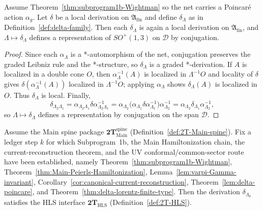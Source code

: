 \begin{lemma}
\label{lem:delta-lorentz-orbit}
Assume Theorem~\ref{thm:subprogram1b-Wightman} so the net carries a Poincar\'e
action $\alpha_g$. Let $\delta$ be a local derivation on $\mathfrak A_{\mathrm{fin}}$ and
define $\delta_\Lambda$ as in Definition~\ref{def:delta-family}. Then each
$\delta_\Lambda$ is again a local derivation on $\mathfrak A_{\mathrm{fin}}$, and
$\Lambda\mapsto\delta_\Lambda$ defines a representation of $SO^+(1,3)$ on $\mathscr D$
by conjugation.
\end{lemma}

\begin{proof}
Since each $\alpha_\Lambda$ is a *-automorphism of the net, conjugation preserves
the graded Leibniz rule and the *-structure, so $\delta_\Lambda$ is a graded *-derivation.
If $A$ is localized in a double cone $O$, then $\alpha_\Lambda^{-1}(A)$ is localized
in $\Lambda^{-1}O$ and locality of $\delta$ gives
$\delta(\alpha_\Lambda^{-1}(A))$ localized in $\Lambda^{-1}O$; applying $\alpha_\Lambda$
shows $\delta_\Lambda(A)$ is localized in $O$. Thus $\delta_\Lambda$ is local.
Finally,
\[
\delta_{\Lambda_2\Lambda_1}
=\alpha_{\Lambda_2\Lambda_1}\delta\alpha_{\Lambda_2\Lambda_1}^{-1}
=\alpha_{\Lambda_2}\big(\alpha_{\Lambda_1}\delta\alpha_{\Lambda_1}^{-1}\big)\alpha_{\Lambda_2}^{-1}
=\alpha_{\Lambda_2}\delta_{\Lambda_1}\alpha_{\Lambda_2}^{-1},
\]
so $\Lambda\mapsto\delta_\Lambda$ defines a representation by conjugation on the span
$\mathscr D$.
\end{proof}

\begin{theorem}
\label{thm:subprogram3b-HLS-hypotheses}
Assume the Main spine package \(\mathbf{2T}_{\mathrm{Main}}^{\mathrm{spine}}\)
\textnormal{(Definition~\ref{def:2T-Main-spine})}. Fix a ledger step \(k\) for which
Subprogram~1b, the Main Hamiltonization chain, the current-reconstruction theorem,
and the UV conformal/common-sector route have been established, namely
Theorem~\ref{thm:subprogram1b-Wightman},
Theorem~\ref{thm:Main-Peierls-Hamiltonization},
Lemma~\ref{lem:varpi-Gamma-invariant},
Corollary~\ref{cor:canonical-current-reconstruction},
Theorem~\ref{lem:delta-poincare},
and Theorem~\ref{thm:delta-lorentz-finite-type}. Then the derivation
\(\delta_{\Lambda_k}\) satisfies the HLS interface
\(\mathbf{2T}_{\mathrm{HLS}}\) \textnormal{(Definition~\ref{def:2T-HLS})}.
\end{theorem}

